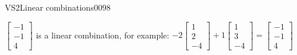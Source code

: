\begin{exercise}{VS2}{Linear combinations}{0098}
\begin{exerciseAnswer}
\begin{itemize}
 \(\left[\begin{array}{c}
-1 \\
-1 \\
4
\end{array}\right]\) is a linear combination, for example: \(
-2 \left[\begin{array}{c}
1 \\
2 \\
-4
\end{array}\right] + 1 \left[\begin{array}{c}
1 \\
3 \\
-4
\end{array}\right] = \left[\begin{array}{c}
-1 \\
-1 \\
4
\end{array}\right]
                            \) 

 
\end{itemize}

     \end{exerciseAnswer}
 \end{exercise}



